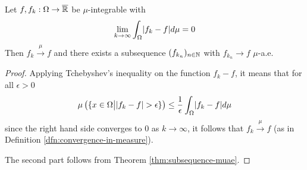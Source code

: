 \begin{cor}[]
Let $f, f_k: \Omega \to \overline{\mathbb{R}}$ be $\mu$-integrable with
\begin{align*}
  \lim_{k \to \infty} \int_{\Omega} \abs{f_k - f} d \mu = 0
\end{align*}
Then $f_k \stackrel{\mu}{\to} f$ and there exists a subsequence $(f_{k_n})_{n \in \mathbb{N}}$ with $f_{k_n} \to f$ $\mu$-a.e.
\end{cor}
\begin{proof}
Applying Tchebyshev's inequality on the function $f_k - f$, it means that for all $\epsilon > 0$
\begin{align*}
  \mu\left(
    \{x \in \Omega \big\vert \abs{f_k - f} > \epsilon\}
  \right)
    \leq \frac{1}{\epsilon} \int_{\Omega} \abs{f_k - f} d \mu
\end{align*}
since the right hand side converges to $0$ as $k \to  \infty$, it follows that $f_k \stackrel{\mu}{\to} f$ (as in Definition \ref{dfn:convergence-in-measure}).

The second part follows from Theorem \ref{thm:subsequence-muae}.
\end{proof}
